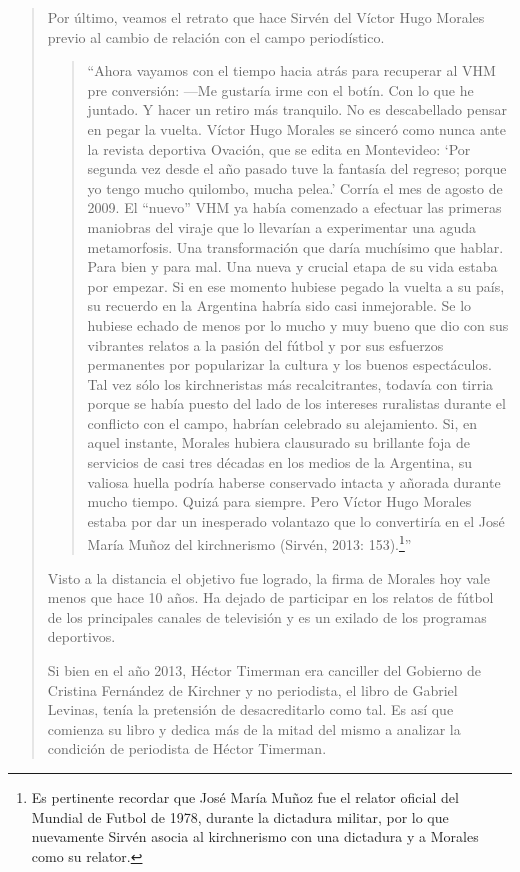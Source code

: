 \begin{quote}
Por último, veamos el retrato que hace Sirvén del Víctor Hugo Morales previo al cambio de relación con el campo periodístico.
\begin{quote}
	\enquote{Ahora vayamos con el tiempo hacia atrás para recuperar al VHM pre conversión: ---Me gustaría irme con el botín. Con lo que he juntado. Y hacer un retiro más tranquilo. No es descabellado pensar en pegar la vuelta. Víctor Hugo Morales se sinceró como nunca ante la revista deportiva Ovación, que se edita en Montevideo: \enquote{Por segunda vez desde el año pasado tuve la fantasía del regreso; porque yo tengo mucho quilombo, mucha pelea.} Corría el mes de agosto de 2009. El ``nuevo'' VHM ya había comenzado a efectuar las primeras maniobras del viraje que lo llevarían a experimentar una aguda metamorfosis. Una transformación que daría muchísimo que hablar. Para bien y para mal. Una nueva y crucial etapa de su vida estaba por empezar. Si en ese momento hubiese pegado la vuelta a su país, su recuerdo en la Argentina habría sido casi inmejorable. Se lo hubiese echado de menos por lo mucho y muy bueno que dio con sus vibrantes relatos a la pasión del fútbol y por sus esfuerzos permanentes por popularizar la cultura y los buenos espectáculos. Tal vez sólo los kirchneristas más recalcitrantes, todavía con tirria porque se había puesto del lado de los intereses ruralistas durante el conflicto con el campo, habrían celebrado su alejamiento. Si, en aquel instante, Morales hubiera clausurado su brillante foja de servicios de casi tres décadas en los medios de la Argentina, su valiosa huella podría haberse conservado intacta y añorada durante mucho tiempo. Quizá para siempre. Pero Víctor Hugo Morales estaba por dar un inesperado volantazo que lo convertiría en el José María Muñoz del kirchnerismo (Sirvén, 2013: 153).\footnote{Es pertinente recordar que José María Muñoz fue el relator oficial del Mundial de Futbol de 1978, durante la dictadura militar, por lo que nuevamente Sirvén asocia al kirchnerismo con una dictadura y a Morales como su relator.}}
\end{quote}

Visto a la distancia el objetivo fue logrado, la firma de Morales hoy vale menos que hace 10 años. Ha dejado de participar en los relatos de fútbol de los principales canales de televisión y es un exilado de los programas deportivos.

Si bien en el año 2013, Héctor Timerman era canciller del Gobierno de Cristina Fernández de Kirchner y no periodista, el libro de Gabriel Levinas, tenía la pretensión de desacreditarlo como tal. Es así que comienza su libro y dedica más de la mitad del mismo a analizar la condición de periodista de Héctor Timerman.


\end{quote}
